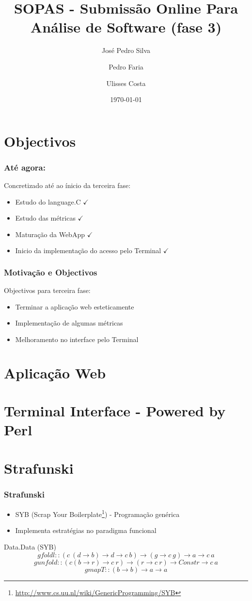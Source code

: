 \documentclass{beamer}
\title{SOPAS - Submissão Online Para Análise de Software (fase 3)}
\author{José Pedro Silva \and
Pedro Faria \and
Ulisses Costa
}
\date{\today}
\institute{Engenharia de Linguagens\\
Projecto integrado
}
\begin{document}
\begin{frame}
   \titlepage
\end{frame}

\section{Objectivos}
\begin{frame} \frametitle{Até agora:}
Concretizado até ao ínicio da terceira fase:
\begin{itemize}
\item Estudo do language.C {\color{green}$\checkmark$}
\item Estudo das métricas {\color{green}$\checkmark$}
\item Maturação da WebApp {\color{green}$\checkmark$}
\item Inicio da implementação do acesso pelo Terminal {\color{green}$\checkmark$}
\end{itemize}
\end{frame}

\begin{frame} \frametitle{Motivação e Objectivos}
Objectivos para terceira fase:
\begin{itemize}
\item Terminar a aplicação web esteticamente
\item Implementação de algumas métricas
\item Melhoramento no interface pelo Terminal
\end{itemize}
\end{frame}

\section{Aplicação Web}
\section{Terminal Interface - Powered by Perl}

\section{Strafunski}
\begin{frame}[fragile] \frametitle{Strafunski}
\begin{itemize}
\item SYB (Scrap Your Boilerplate\footnote{\url{http://www.cs.uu.nl/wiki/GenericProgramming/SYB}}) - Programação genérica
\item Implementa estratégias no paradigma funcional
\end{itemize}

\begin{block}{Data.Data (SYB)}
$$gfoldl :: (c~(d \rightarrow b) \rightarrow d \rightarrow c~b) \rightarrow (g \rightarrow c~g) \rightarrow a \rightarrow c~a$$
$$gunfold :: (c (b \rightarrow r) \rightarrow c~r) \rightarrow (r \rightarrow c~r) \rightarrow Constr \rightarrow c~a$$
$$gmapT :: (b \rightarrow b) \rightarrow a \rightarrow a$$
\end{block}
\end{frame}
\end{document}
